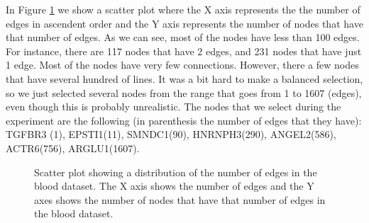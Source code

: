 In Figure \ref{fig:edges_nodes_blood} we show a scatter plot where the X axis represents the the number of edges in ascendent order and the Y axis represents the number of nodes that have that number of edges. As we can see, most of the nodes have less than 100 edges. For instance, there are 117 nodes that have 2 edges, and 231 nodes that have just 1 edge. Most of the nodes have very few connections. However, there a few nodes that have several hundred of lines. It was a bit hard to make a balanced selection, so we just selected several nodes from the range that goes from 1 to 1607 (edges), even though this is probably unrealistic. The nodes that we select during the experiment are the following (in parenthesis the number of edges that they have): TGFBR3 (1), EPSTI1(11), SMNDC1(90), HNRNPH3(290), ANGEL2(586), ACTR6(756), ARGLU1(1607).

\begin{figure}[h!]
  \centering
  \begin{minipage}{.8\textwidth}
  \end{minipage}
\caption{Scatter plot showing a distribution of the number of edges in the blood dataset. The X axis shows the number of edges and the Y axes shows the number of nodes that have that number of edges in the blood dataset.}
\label{fig:edges_nodes_blood}
\end{figure}

